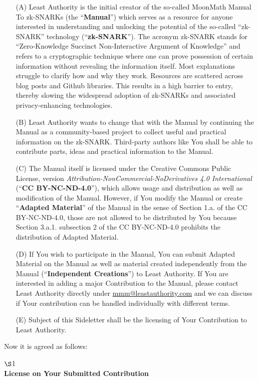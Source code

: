 \begin{itemize}
\item[(A)] Least Authority is the initial creator of the so-called MoonMath Manual To zk-SNARKs (the ``\textbf{Manual}'') which serves as a resource for anyone interested in understanding and unlocking the potential of the so-called ``zk-SNARK'' technology (``\textbf{zk-SNARK}''). The acronym zk-SNARK stands for “Zero-Knowledge Succinct Non-Interactive Argument of Knowledge” and refers to a cryptographic technique where one can prove possession of certain information without revealing the information itself. Most explanations struggle to clarify how and why they work. Resources are scattered across blog posts and Github libraries. This results in a high barrier to entry, thereby slowing the widespread adoption of zk-SNARKs and associated privacy-enhancing technologies. 
\item[(B)] Least Authority wants to change that with the Manual by continuing the Manual as a community-based project to collect useful and practical information on the zk-SNARK. Third-party authors like You shall be able to contribute parts, ideas and practical information to the Manual. 
\item[(C)] The Manual itself is licensed under the Creative Commons Public License, version \textsl{Attri\-bution-NonCommercial-NoDerivatives 4.0 International} (``\textbf{CC BY-NC-ND-4.0}''), which allows usage and distribution as well as modification of the Manual. However, if You modify the Manual or create ``\textbf{Adapted Material}'' of the Manual in the sense of Section 1.a. of the CC BY-NC-ND-4.0, those are not allowed to be distributed by You because Section 3.a.1. subsection 2 of the CC BY-NC-ND-4.0 prohibits the distribution of Adapted Material. 
\item[(D)] If You wish to participate in the Manual, You can submit Adapted Material on the Manual as well as material created independently from the Manual (``\textbf{Independent Creations}'') to Least Authority. If You are interested in adding a major Contribution to the Manual, please contact Least Authority directly under \href{mailto:mmm@leastauthority.com}{mmm@leastauthority.com} and we can discuss if Your contribution can be handled individually with different terms.
\item[(E)] Subject of this Sideletter shall be the licensing of Your Contribution to Least Authority. 
\end{itemize}
Now it is agreed as follows:

\begin{center}
$\S$1\\\bfseries
License on Your Submitted Contribution
\end{center}

